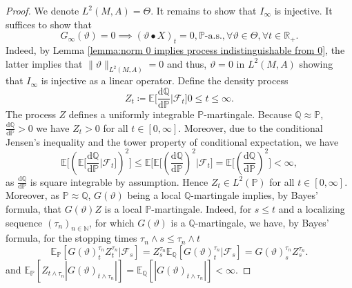 \documentclass[11pt,a4paper,twoside,openany]{report}
\numberwithin{equation}{section}
\newcommand{\diff}{\mathrm{d}}
\theoremstyle{plain} %
\theoremstyle{definition} %
\theoremstyle{remark} %
\begin{document}
\begin{proof}
    We denote \(L^2(M,A)=\Theta\). It remains to show that \(I_{\infty}\) is injective. It suffices to show that 
    \begin{equation*}
        G_{\infty}(\vartheta)=0\implies (\vartheta\bullet X)_{t}=0,\mathbb{P}\text{-a.s.},\forall \vartheta\in\Theta,\forall t\in\mathbb{R}_+.
    \end{equation*}
 Indeed, by Lemma \ref{lemma:norm 0 implies process indistinguishable from 0}, the latter implies that \(\lVert\vartheta\rVert_{L^2(M,A)}=0\) and thus, \(\vartheta=0\) in \(L^2(M,A)\)
 showing that \(I_{\infty}\) is injective as a linear operator. Define the density process
    \begin{equation*}
        Z_t\coloneqq \mathbb{E}\bigg[\frac{\diff \mathbb{Q}}{\diff \mathbb{P}}\bigg|\mathcal{F}_t\bigg] 0\leq t\leq \infty.
    \end{equation*}
    The process \(Z\) defines a uniformly integrable \(\mathbb{P}\)-martingale.
    Because \(\mathbb{Q}\approx \mathbb{P}\), \(\frac{\diff \mathbb{Q}}{\diff \mathbb{P}}>0\) we have \(Z_t>0\) for all \(t\in [0,\infty]\). Moreover, due to the conditional Jensen's inequality and the tower property of conditional expectation, we have 
    \begin{equation*}
        \mathbb{E}\bigg[(\mathbb{E}\bigg[\frac{\diff \mathbb{Q}}{\diff \mathbb{P}}\bigg|\mathcal{F}_t\bigg])^2\bigg]\leq\mathbb{E}\bigg[\mathbb{E}\bigg[(\frac{\diff \mathbb{Q}}{\diff \mathbb{P}})^2\bigg|\mathcal{F}_t\bigg]=\mathbb{E}\bigg[(\frac{\diff \mathbb{Q}}{\diff \mathbb{P}})^2\bigg]<\infty,
    \end{equation*}
    as \(\frac{\diff \mathbb{Q}}{\diff \mathbb{P}}\) is square integrable by assumption.
    Hence \(Z_t\in L^2(\mathbb{P})\) for all \(t\in[0,\infty]\). Moreover, as \(\mathbb{P}\approx\mathbb{Q}\), \(G(\vartheta)\) being a local \(\mathbb{Q}\)-martingale implies, by Bayes' formula, that \(G(\vartheta)Z\) is a local \(\mathbb{P}\)-martingale. Indeed, for \(s\leq t\) and a localizing sequence \((\tau_n)_{n\in\mathbb{N}}\), for which  \(G(\vartheta)\) is a \(\mathbb{Q}\)-martingale, we have, by Bayes' formula, for the stopping times \(\tau_n\wedge s\leq \tau_n\wedge t\)
    \begin{equation*}
        \mathbb{E}_{\mathbb{P}}[G(\vartheta)^{\tau_n}_{t}Z^{\tau_n}_{t}|\mathcal{F}_s]=Z^{\tau_n}_{s}\mathbb{E}_{\mathbb{Q}}[G(\vartheta)^{\tau_n}_{t}|\mathcal{F}_s]=G(\vartheta)^{\tau_n}_{s}Z^{\tau_n}_{s}.
    \end{equation*}
    and \(\mathbb{E}_{\mathbb{P}}[Z_{t\wedge\tau_n}|G(\vartheta)_{t\wedge\tau_n}|]=\mathbb{E}_{\mathbb{Q}}[|G(\vartheta)_{t\wedge\tau_n}|]<\infty\).
    

\end{proof}
\end{document}
